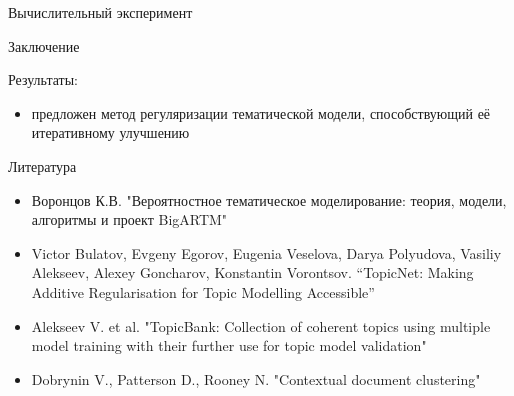 \documentclass{beamer}
\begin{document}
\begin{frame}{Вычислительный эксперимент}



\end{frame}
\begin{frame}{Заключение}
    \begin{block}{Результаты:}
    \begin{itemize}
        \item предложен метод регуляризации тематической модели, способствующий её итеративному улучшению
    \end{itemize}
    \end{block}
\end{frame}
\begin{frame}{Литература}
\begin{itemize}
    \item Воронцов К.В. "Вероятностное тематическое моделирование: теория, модели, алгоритмы и проект BigARTM"
    \item Victor Bulatov, Evgeny Egorov, Eugenia Veselova, Darya Polyudova, Vasiliy Alekseev, Alexey Goncharov, Konstantin Vorontsov. “TopicNet: Making Additive Regularisation for Topic Modelling Accessible”
    \item Alekseev V. et al. "TopicBank: Collection of coherent topics using multiple model training with their further use for topic model validation"
    \item Dobrynin V., Patterson D., Rooney N. "Contextual document clustering"
\end{itemize}
\end{frame}
\end{document}
